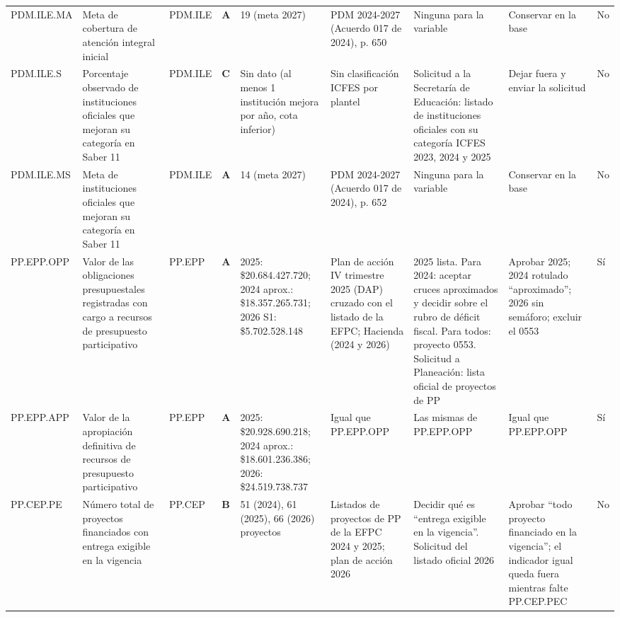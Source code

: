 \documentclass[11pt,letterpaper]{article}
\begin{document}
{\begin{xltabular}{\linewidth}{L{1.94cm}L{2.56cm}L{2.04cm}L{1.12cm}L{2.87cm}L{2.87cm}L{2.71cm}L{2.77cm}L{2.04cm}}
PDM.ILE.MA & Meta de cobertura de atención integral inicial & PDM.ILE & \textbf{A} & 19 (meta 2027) & PDM 2024-2027 (Acuerdo 017 de 2024), p. 650 & Ninguna para la variable & Conservar en la base & No \\
PDM.ILE.S & Porcentaje observado de instituciones oficiales que mejoran su categoría en Saber 11 & PDM.ILE & \textbf{C} & Sin dato (al menos 1 institución mejora por año, cota inferior) & Sin clasificación ICFES por plantel & Solicitud a la Secretaría de Educación: listado de instituciones oficiales con su categoría ICFES 2023, 2024 y 2025 & Dejar fuera y enviar la solicitud & No \\
PDM.ILE.MS & Meta de instituciones oficiales que mejoran su categoría en Saber 11 & PDM.ILE & \textbf{A} & 14 (meta 2027) & PDM 2024-2027 (Acuerdo 017 de 2024), p. 652 & Ninguna para la variable & Conservar en la base & No \\
PP.EPP.OPP & Valor de las obligaciones presupuestales registradas con cargo a recursos de presupuesto participativo & PP.EPP & \textbf{A} & 2025: \$20.684.427.720; 2024 aprox.: \$18.357.265.731; 2026 S1: \$5.702.528.148 & Plan de acción IV trimestre 2025 (DAP) cruzado con el listado de la EFPC; Hacienda (2024 y 2026) & 2025 lista. Para 2024: aceptar cruces aproximados y decidir sobre el rubro de déficit fiscal. Para todos: proyecto 0553. Solicitud a Planeación: lista oficial de proyectos de PP & Aprobar 2025; 2024 rotulado ``aproximado''; 2026 sin semáforo; excluir el 0553 & Sí \\
PP.EPP.APP & Valor de la apropiación definitiva de recursos de presupuesto participativo & PP.EPP & \textbf{A} & 2025: \$20.928.690.218; 2024 aprox.: \$18.601.236.386; 2026: \$24.519.738.737 & Igual que PP.EPP.OPP & Las mismas de PP.EPP.OPP & Igual que PP.EPP.OPP & Sí \\
PP.CEP.PE & Número total de proyectos financiados con entrega exigible en la vigencia & PP.CEP & \textbf{B} & 51 (2024), 61 (2025), 66 (2026) proyectos & Listados de proyectos de PP de la EFPC 2024 y 2025; plan de acción 2026 & Decidir qué es ``entrega exigible en la vigencia''. Solicitud del listado oficial 2026 & Aprobar ``todo proyecto financiado en la vigencia''; el indicador igual queda fuera mientras falte PP.CEP.PEC & No \\

\end{xltabular}}
\end{document}
